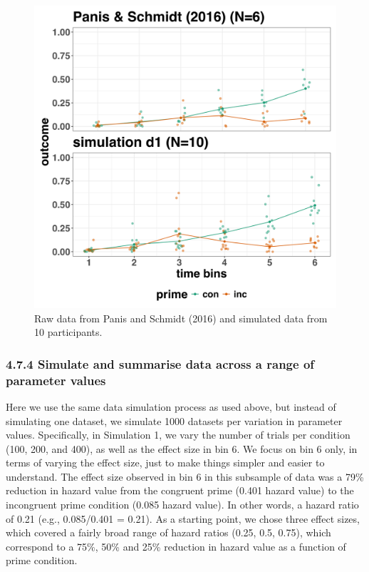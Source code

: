\documentclass[
  man, donotrepeattitle,floatsintext]{apa6}
\begin{document}
\begin{figure}[H]

{\centering \includegraphics[width=0.8\linewidth,height=0.67\textheight,]{../Tutorial_4_Planning/figures/raw_vs_d1} 

}

\caption{Raw data from Panis and Schmidt (2016) and simulated data from 10 participants.}\label{fig:simdat}
\end{figure}

\subsubsection{4.7.4 Simulate and summarise data across a range of parameter values}\label{simulate-and-summarise-data-across-a-range-of-parameter-values}

Here we use the same data simulation process as used above, but instead of simulating one dataset, we simulate 1000 datasets per variation in parameter values.
Specifically, in Simulation 1, we vary the number of trials per condition (100, 200, and 400), as well as the effect size in bin 6.
We focus on bin 6 only, in terms of varying the effect size, just to make things simpler and easier to understand.
The effect size observed in bin 6 in this subsample of data was a 79\% reduction in hazard value from the congruent prime (0.401 hazard value) to the incongruent prime condition (0.085 hazard value). In other words, a hazard ratio of 0.21 (e.g., 0.085/0.401 = 0.21).
As a starting point, we chose three effect sizes, which covered a fairly broad range of hazard ratios (0.25, 0.5, 0.75), which correspond to a 75\%, 50\% and 25\% reduction in hazard value as a function of prime condition.
\end{document}
